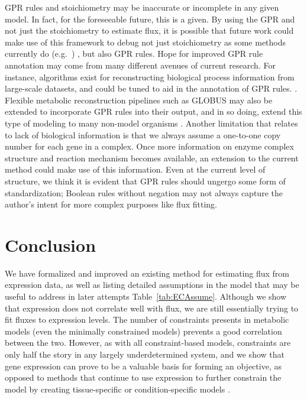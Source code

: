 GPR rules and stoichiometry may be inaccurate or
incomplete in any given model. In fact, for the foreseeable future,
this is a given. By using the GPR and not just the stoichiometry to
estimate flux, it is possible that future work could make use of this
framework to debug not just stoichiometry as some methods currently do
(e.g.\ \citealt{Reed14112006}) , but also GPR rules.  Hope for
improved GPR rule annotation may come from many different avenues of
current research. For instance, algorithms exist for reconstructing
biological process information from large-scale datasets, and could be
tuned to aid in the annotation of GPR rules.
\citep{Mitra2013}. Flexible metabolic reconstruction pipelines such as
GLOBUS may also be extended to incorporate GPR rules into their output, and
in so doing, extend this type of modeling to many non-model organisms
\citep{Plata2012}. Another limitation that relates to lack of
biological information is that we always assume a one-to-one copy
number for each gene in a complex. Once more information on enzyme
complex structure and reaction mechanism becomes available, an
extension to the current method could make use of this information.
Even at the current level of structure, we think it is evident
that GPR rules should ungergo some form of standardization;
Boolean rules without negation may not always capture the author's
intent for more complex purposes like flux fitting.



%
%


\section{Conclusion}

We have formalized and improved an existing method for estimating flux
from expression data, as well as listing detailed assumptions in the
model that may be useful to address in later attempts
Table~\ref{tab:ECAssume}.  Although we show that expression does not
correlate well with flux, we are still essentially trying to fit
fluxes to expression levels.  The number of constraints presents in
metabolic models (even the minimally constrained models) prevents 
a good correlation between the two. However, as
with all constraint-based models, constraints are only half the story in any largely
underdetermined system, and we show that gene expression can prove to
be a valuable basis for forming an objective, as opposed to methods
that continue to use expression to further constrain the model by
creating tissue-specific or condition-specific models
\citep{Shlomi2008,Becker2008}.

